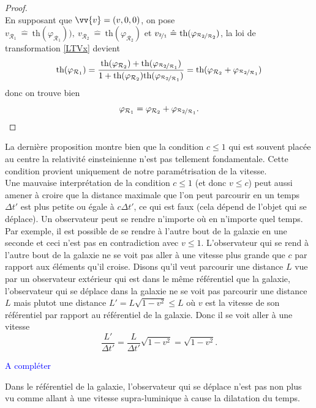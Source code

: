\documentclass[a4paper,11pt]{report}
\theoremstyle{definition}
\theoremstyle{plain}
\theoremstyle{definition}
\theoremstyle{remark}
\renewcommand{\th}[1]{\text{th}(#1)}
\newcommand{\comp}{\begin{center}\textcolor{blue}{A compléter}\end{center}}
\newcommand{\R}{\mathcal{R}}
\begin{document}
            \begin{proof}
            ${}$\\
                En supposant que $\vv{v} = (v,0,0)$, on pose $v_{\R_1} ~\hat{=}~ \th{\varphi_{\R_1})},~ v_{\R_2} ~\hat{=}~ \th{\varphi_{\R_2}}$ et $v_{\nicefrac{2}{1}} ~\hat{=}~ \th{\varphi_{\nicefrac{\R_2}{\R_2}}}$, la loi de transformation \ref{LTVx} devient
                \begin{equation}
                    \th{\varphi_{\R_1}} = \frac{\th{\varphi_{\R_2}}+\th{\varphi_{\nicefrac{\R_2}{\R_1}}}}{1+\th{\varphi_{\R_2}}\th{\varphi_{\nicefrac{\R_2}{\R_1}}}} = \th{\varphi_{\R_2}+\varphi_{\nicefrac{\R_2}{\R_1}}}
                \end{equation}
                donc on trouve bien
                \begin{equation}
                    \varphi_{\R_1} = \varphi_{\R_2}+\varphi_{\nicefrac{\R_2}{\R_1}}.
                \end{equation}
            \end{proof}
            
            La dernière proposition montre bien que la condition $c\leq 1$ qui est souvent placée au centre la relativité einsteinienne n'est pas tellement fondamentale. Cette condition provient uniquement de notre paramétrisation de la vitesse.\\
            
            Une mauvaise interprétation de la condition $c\leq1$ (et donc $v\leq c$) peut aussi amener à croire que la distance maximale que l'on peut parcourir en un temps $\Delta t'$ est plus petite ou égale à $c\Delta t'$, ce qui est faux (cela dépend de l'objet qui se déplace). Un observateur peut se rendre n'importe où en n'importe quel temps. Par exemple, il est possible de se rendre à l'autre bout de la galaxie en une seconde et ceci n'est pas en contradiction avec $v\leq 1$. L'observateur qui se rend à l'autre bout de la galaxie ne se voit pas aller à une vitesse plus grande que $c$ par rapport aux éléments qu'il croise. Disons qu'il veut parcourir une distance $L$ vue par un observateur extérieur qui est dans le même référentiel que la galaxie, l'observateur qui se déplace dans la galaxie ne se voit pas parcourir une distance $L$ mais plutot une distance $L' = L\sqrt{1-v^2}\leq L$ où $v$ est la vitesse de son référentiel par rapport au référentiel de la galaxie. Donc il se voit aller à une vitesse
            \begin{equation}
                \frac{L'}{\Delta t'} = \frac{L}{\Delta t'} \sqrt{1-v^2} = \sqrt{1-v^2}.
            \end{equation}
            \comp
            Dans le référentiel de la galaxie, l'observateur qui se déplace n'est pas non plus vu comme allant à une vitesse supra-luminique à cause la dilatation du temps.\\
            
\end{document}
